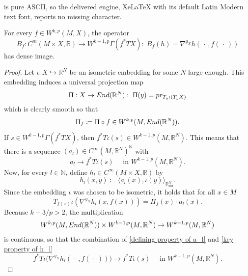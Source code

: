 \documentclass[10pt,a4paper]{amsart}
\newcommand{\End}{\textnormal{End}}
\newcommand{\bN}{\mathbb{N}}
\newcommand{\bR}{\mathbb{R}}
\newcommand{\pr}{\textnormal{pr}}
\begin{document}
is pure ASCII, so the delivered engine, XeLaTeX with its default Latin Modern text font, reports no missing character.
\begin{lemma}\label{dense image}
  For every $f \in W^{k, p}(M, X)$, the operator 
  \begin{equation*}
    B_f: C^m(M \times X, \bR) \to W^{k-1, p}\Gamma(f^* TX): \; B_f(h)=\nabla^{g_X} h(\, \cdot \,, f(\, \cdot \,))
  \end{equation*}
  has dense image.
\end{lemma}

\begin{proof}
  Let $\iota: X \hookrightarrow \bR^N$ be an isometric embedding for some $N$ large enough. This embedding induces a universal projection map
  \begin{equation*}
    \Pi: X \to \End (\bR^N): \; \Pi(y) = \pr_{T_y \iota (T_y X)}
  \end{equation*}
  which is clearly smooth so that 
  \begin{equation*}
    \Pi_f \coloneq \Pi \circ f \in W^{k,p}(M, \End (\bR^N)).
  \end{equation*}
  If $s \in W^{k-1, p}\Gamma(f^*TX)$, then $f^*T\iota(s)\in W^{k-1, p}(M, \bR^N)$. This means that there is a sequence $(a_l)\in C^\infty(M, \bR^N)^\bN$ with 
  \begin{equation}\label{defining property of a_l}
    a_l  \to f^*T\iota(s) \quad \text{ in } W^{k-1, p}(M, \bR^N).
  \end{equation}
  Now, for every $l \in \bN$, define $h_l \in C^\infty(M\times X, \bR)$ by
  \begin{equation*}
    h_l(x, y) \coloneq \langle a_l(x), \iota(y) \rangle_{\bR^N_{\text{std}}}.
  \end{equation*}
  Since the embedding $\iota$ was chosen to be isometric, it holds that for all $x \in M$
  \begin{equation}\label{key property of h_l}
    T_{f(x)} \iota (\nabla^{g_X} h_l (x, f(x))) = \Pi_f (x) \cdot a_l(x).
  \end{equation} 
  Because $k-3/p>2$, the multiplication
  \begin{equation*}
    W^{k, p}(M, \End(\bR^N)) \times W^{k-1, p}(M, \bR^N) \to W^{k-1, p}(M, \bR^N)
  \end{equation*}
  is continuous, so that the combination of \eqref{defining property of a_l} and \eqref{key property of h_l}
  \begin{equation}\label{key convergence 1}
    f^*T \iota \Big( \nabla^{g_X} h_l( \, \cdot \, , f(\, \cdot \, ))\Big) \to f^*T \iota (s) \quad \text{ in } W^{k-1, p}(M, \bR^N).

\end{equation}
\end{proof}
\end{document}
